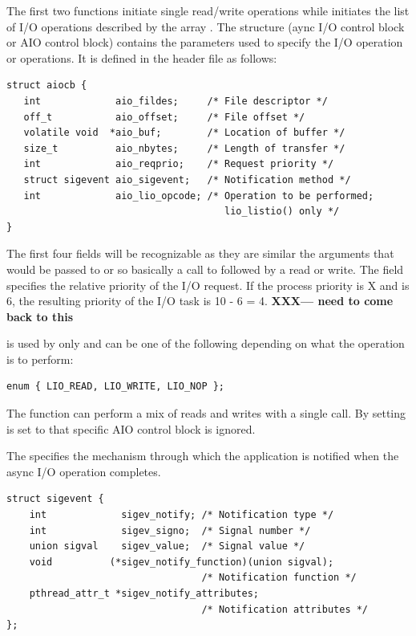 \noindent
The first two functions initiate single read/write operations while  initiates the list of I/O operations described by the array . The  structure (aync I/O control block or AIO control block) contains the parameters used to specify the I/O operation or operations. It is defined in the  header file as follows:

\begin{lstlisting}
struct aiocb {
   int             aio_fildes;     /* File descriptor */
   off_t           aio_offset;     /* File offset */
   volatile void  *aio_buf;        /* Location of buffer */
   size_t          aio_nbytes;     /* Length of transfer */
   int             aio_reqprio;    /* Request priority */
   struct sigevent aio_sigevent;   /* Notification method */
   int             aio_lio_opcode; /* Operation to be performed; 
                                      lio_listio() only */                                     
}
\end{lstlisting}

\noindent
The first four fields will be recognizable as they are similar the arguments that would be passed to  or  so basically a call to  followed by a read or write. The  field specifies the relative priority of the I/O request. If the process priority is X and  is 6, the resulting priority of the I/O task is 10 - 6 = 4. \textbf{XXX--- need to come back to this}

 is used by  only and can be one of the following depending on what the operation is to perform:

\begin{lstlisting}
enum { LIO_READ, LIO_WRITE, LIO_NOP };
\end{lstlisting}

\noindent
The  function can perform a mix of reads and writes with a single call. By setting   is set to  that specific AIO control block is ignored. 

The  specifies the mechanism through which the application is notified when the async I/O operation completes.

\begin{lstlisting}
struct sigevent {
    int             sigev_notify; /* Notification type */
    int             sigev_signo;  /* Signal number */
    union sigval    sigev_value;  /* Signal value */
    void          (*sigev_notify_function)(union sigval);
                                  /* Notification function */
    pthread_attr_t *sigev_notify_attributes;
                                  /* Notification attributes */
};
\end{lstlisting}

